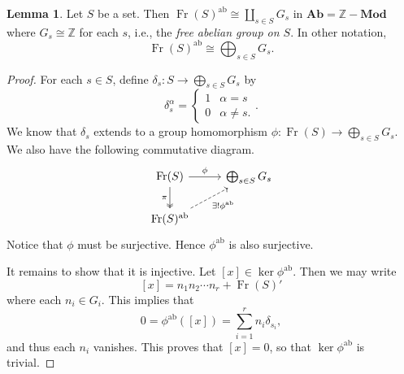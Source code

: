 \documentclass[10pt,letterpaper,cm]{nupset}
\theoremstyle{definition}
\theoremstyle{theorem}
\newtheorem{lemma}[definition]{Lemma}
\theoremstyle{remark}
\newcommand{\Z}{\mathbb Z}
\newcommand{\1}{\mathbf{1}}
\newcommand{\0}{\vec 0}
\DeclareMathOperator{\ab}{ab}
\DeclareMathOperator{\Fr}{Fr}
\begin{document}
\begin{lemma}
Let $S$ be a set. Then $\Fr(S)^{\ab}\cong \coprod_{s\in S} G_s$ in $\mathbf{Ab} = \Z{-}\mathbf{Mod}$ where $G_s\cong \Z$ for each $s$, i.e., the \textit{free abelian group on $S$}. In other notation, $$\Fr(S)^{\ab} \cong \bigoplus_{s\in S} G_s.$$
\end{lemma}
\begin{proof}
For each $s\in S$, define $\delta_s : S \to \bigoplus_{s\in S} G_s$ by $$\delta_s^{\alpha} =  \begin{cases} 1 & \alpha = s \\ 0 & \alpha \ne s . \end{cases}.$$ We know that $\delta_s$ extends to a group  homomorphism $ \phi : \Fr(S) \to \bigoplus_{s\in S} G_s$. We also have the following commutative diagram.
\[
\begin{tikzcd}
\Fr(S) \arrow[d, "\pi"', two heads] \arrow[r, "\phi"] & \bigoplus_{s\in S} G_s \\
\Fr(S)^{\ab} \arrow[ru, "\exists! \phi^{\ab}"', dashed] & 
\end{tikzcd}
\]
Notice that $\phi$ must be surjective. Hence $\phi^{\ab}$ is also surjective.

It remains to show that it is injective. Let $\left[x\right] \in \ker{\phi}^{\ab}$.
Then we may write $$\left[x\right] = n_1n_2\cdots n_r+\Fr(S)'$$ where each $n_i \in G_i$. This implies that $$0= \phi^{\ab}(\left[x\right]) = \sum_{i=1}^r n_i \delta_{s_i},$$ and thus each $n_i$ vanishes. This proves that $\left[x\right]=0$, so that $\ker{\phi^{\ab}}$ is trivial. 
\end{proof}
\end{document}
